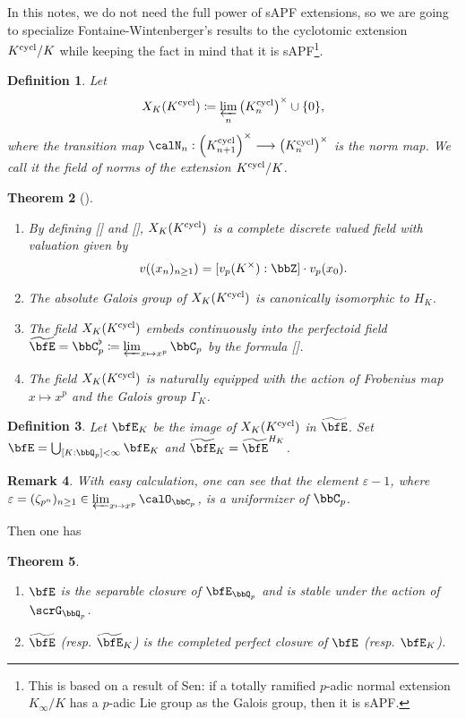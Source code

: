 \documentclass[a4paper,oneside]{amsart}
\newtheorem{theorem}{Theorem}[subsection]
\newtheorem{remark}[theorem]{Remark}
\newtheorem{definition}[theorem]{Definition}
\numberwithin{equation}{section}
\numberwithin{figure}{section}
\begin{document}
In this notes, we do not need the full power of sAPF extensions, so we are going to specialize Fontaine-Wintenberger's results to the cyclotomic extension $K^{\operatorname{cycl}}/K$ while keeping the fact in mind that it is sAPF\footnote{This is based on a result of Sen: if a totally ramified $p$-adic normal extension $K_\infty/K$ has a $p$-adic Lie group as the Galois group, then it is sAPF.}.
\begin{definition}
	Let $$X_K(K^{\operatorname{cycl}})\coloneqq\varprojlim_n \left(K_n^{\operatorname{cycl}}\right)^\times\cup\{0\},$$
	where the transition map $\calN_n:\left(K_{n+1}^{\opn{cycl}}\right)^\times\lto \left(K_n^{\opn{cycl}}\right)^\times$ is the norm map. We call it the field of norms of the extension $K^{\operatorname{cycl}}/K$.
\end{definition}
\begin{theorem}[{\cite{wintenberger_corps_1983}}]\leavevmode
	\begin{enumerate}
		\item By defining [] and [], $X_K(K^{\operatorname{cycl}})$ is a complete discrete valued field with valuation given by
		      $$v((x_n)_{n\geq 1})=[v_p(K^\times):\bbZ]\cdot v_p(x_0).$$
		\item The absolute Galois group of $X_K(K^{\operatorname{cycl}})$ is canonically isomorphic to $H_K$.
		\item The field $X_K(K^{\operatorname{cycl}})$ embeds continuously into the perfectoid field $\widetilde{\bfE}=\bbC_p^\flat\coloneqq \varprojlim_{x\mapsto x^p}\bbC_p$ by the formula [].
		\item The field $X_K(K^{\operatorname{cycl}})$ is naturally equipped with the action of Frobenius map $x\mapsto x^p$ and the Galois group $\Gamma_K$.
	\end{enumerate}
\end{theorem}
\begin{definition}
	Let $\bfE_K$ be the image of $X_K(K^{\operatorname{cycl}})$ in $\widetilde{\bfE}$. Set $\bfE=\bigcup_{[K:\bbQ_p]<\infty}\bfE_K$ and $\widetilde{\bfE}_K=\widetilde{\bfE}^{H_K}$.
\end{definition}
\begin{remark}
	With easy calculation, one can see that the element $\varepsilon-1$, where $\varepsilon=(\zeta_{p^n})_{n\geq 1}\in \varprojlim_{x\mapsto x^p}\calO_{\bbC_p}$, is a uniformizer of $\bbC_p$.
\end{remark}
Then one has
\begin{theorem}\leavevmode
	\begin{enumerate}
		\item $\bfE$ is the separable closure of $\bfE_{\bbQ_p}$ and is stable under the action of $\scrG_{\bbQ_p}$.
		\item $\widetilde{\bfE}$ (resp. $\widetilde{\bfE}_K$) is the completed perfect closure of $\bfE$ (resp. $\bfE_K$).
	\end{enumerate}
\end{theorem}
\end{document}
